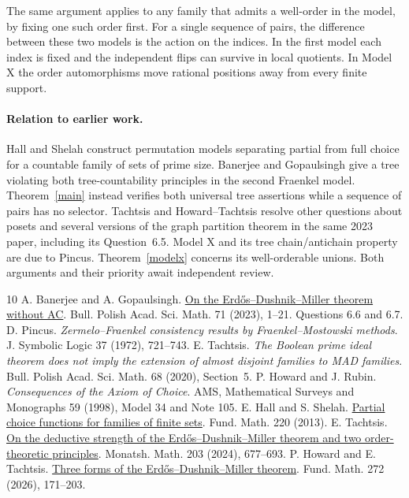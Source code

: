 \documentclass[11pt]{article}
\begin{document}
The same argument applies to any family that admits a well-order in the model, by fixing one such order first. For a single sequence of pairs, the difference between these two models is the action on the indices. In the first model each index is fixed and the independent flips can survive in local quotients. In Model X the order automorphisms move rational positions away from every finite support.

\paragraph{Relation to earlier work.} Hall and Shelah \cite{hs} construct permutation models separating partial from full choice for a countable family of sets of prime size. Banerjee and Gopaulsingh \cite[Remark~4.5]{bg} give a tree violating both tree-countability principles in the second Fraenkel model. Theorem~\ref{main} instead verifies both universal tree assertions while a sequence of pairs has no selector. Tachtsis \cite{t24} and Howard--Tachtsis \cite{ht26} resolve other questions about posets and several versions of the graph partition theorem in the same 2023 paper, including its Question~6.5. Model X and its tree chain/antichain property are due to Pincus. Theorem~\ref{modelx} concerns its well-orderable unions. Both arguments and their priority await independent review.
\begin{thebibliography}{10}
 A. Banerjee and A. Gopaulsingh. \href{https://doi.org/10.4064/ba221221-6-6}{On the Erdős--Dushnik--Miller theorem without AC}. Bull. Polish Acad. Sci. Math. 71 (2023), 1--21. Questions 6.6 and 6.7.
 D. Pincus. \emph{Zermelo--Fraenkel consistency results by Fraenkel--Mostowski methods}. J. Symbolic Logic 37 (1972), 721--743.
 E. Tachtsis. \emph{The Boolean prime ideal theorem does not imply the extension of almost disjoint families to MAD families}. Bull. Polish Acad. Sci. Math. 68 (2020), Section~5.
 P. Howard and J. Rubin. \emph{Consequences of the Axiom of Choice}. AMS, Mathematical Surveys and Monographs 59 (1998), Model 34 and Note 105.
 E. Hall and S. Shelah. \href{https://arxiv.org/abs/0808.0535}{Partial choice functions for families of finite sets}. Fund. Math. 220 (2013).
 E. Tachtsis. \href{https://doi.org/10.1007/s00605-023-01933-z}{On the deductive strength of the Erdős--Dushnik--Miller theorem and two order-theoretic principles}. Monatsh. Math. 203 (2024), 677--693.
 P. Howard and E. Tachtsis. \href{https://doi.org/10.4064/fm250514-20-7}{Three forms of the Erdős--Dushnik--Miller theorem}. Fund. Math. 272 (2026), 171--203.
\end{thebibliography}
\end{document}
